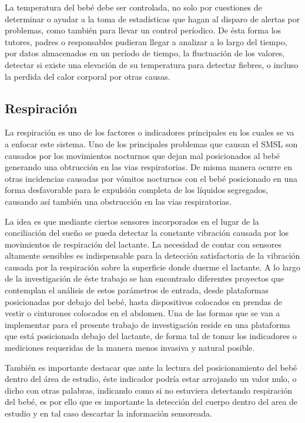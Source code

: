 \documentclass{IEEEtran}
\begin{document}
			La temperatura del bebé debe ser controlada, no solo por cuestiones de determinar o ayudar a la toma de estadísticas que hagan al disparo de alertas por problemas, como también para llevar un control períodico. De ésta forma los tutores, padres o responsables pudieran llegar a analizar a lo largo del tiempo, por datos almacenados en un período de tiempo, la fluctuación de los valores, detectar si existe una elevación de su temperatura para detectar fiebres, o incluso la perdida del calor corporal por otras causas.

		\subsection{Respiración}

			La respiración es uno de los factores o indicadores principales en los cuales se va a enfocar este sistema. Uno de los principales problemas que causan el SMSL son causados por los movimientos nocturnos que dejan mal posicionados al bebé generando una obtrucción en las vias respiratorias. De misma manera ocurre en otras incidencias causadas por vómitos nocturnos con el bebé posicionado en una forma desfavorable para le expulsión completa de los líquidos segregados, causando así también una obstrucción en las vias respiratorias.

			La idea es que mediante ciertos sensores incorporados en el lugar de la conciliación del sueño se pueda detectar la constante vibración causada por los movimientos de respiración del lactante. La necesidad de contar con sensores altamente sensibles es indispensable para la detección satisfactoria de la vibración causada por la respiración sobre la superficie donde duerme el lactante. A lo largo de la investigación de éste trabajo se han encontrado diferentes proyectos que contemplan el análisis de estos parámetros de entrada, desde plataformas posicionadas por debajo del bebé, hasta dispositivos colocados en prendas de vestir o cinturones colocados en el abdomen. Una de las formas que se van a implementar para el presente trabajo de investigación reside en una plataforma que está posicionada debajo del lactante, de forma tal de tomar los indicadores o mediciones requeridas de la manera menos invasiva y natural posible.

			También es importante destacar que ante la lectura del posicionamiento del bebé dentro del área de estudio, éste indicador podría estar arrojando un valor nulo, o dicho con otras palabras, indicando como si no estuviera detectando respiración del bebé, es por ello que es importante la detección del cuerpo dentro del area de estudio y en tal caso descartar la información sensoreada.
	
\end{document}
